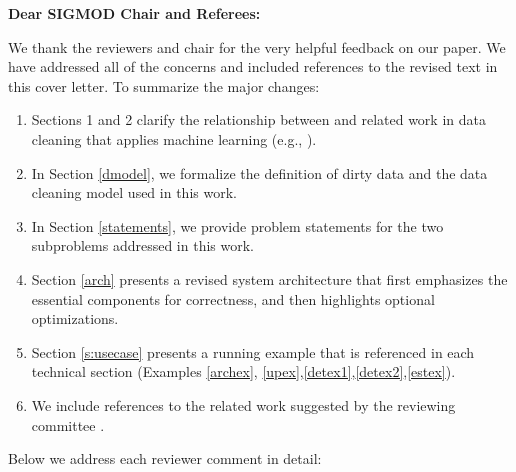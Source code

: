 {\noindent \normalsize \bf Dear SIGMOD Chair and Referees: }

\vspace{.5em}

We thank the reviewers and chair for the very helpful feedback on our paper. 
We have addressed all of the concerns and included references to the revised text in this cover letter. 
To summarize the major changes:

\begin{enumerate}
\item Sections 1 and 2 clarify the relationship between \sys and related work in data cleaning that applies machine learning (e.g., \cite{gokhale2014corleone, DBLP:journals/pvldb/YakoutENOI11, yakout2013don}).

\item In Section \ref{dmodel}, we formalize the definition of dirty data and the data cleaning model used in this work.

\item In Section \ref{statements}, we provide problem statements for the two subproblems addressed in this work.

\item Section \ref{arch} presents a revised system architecture that first emphasizes the essential components for correctness, and then highlights optional optimizations. 

\item Section \ref{s:usecase} presents a running example that is referenced in each technical section (Examples \ref{archex}, \ref{upex},\ref{detex1},\ref{detex2},\ref{estex}).

\item We include references to the related work suggested by the reviewing committee \cite{whang2014incremental, papenbrock2015progressive, gruenheid2014incremental, DBLP:journals/pvldb/YakoutENOI11, yakout2013don, heise2014estimating}.

\end{enumerate}
Below we address each reviewer comment in detail:

\vspace{0.5em}

